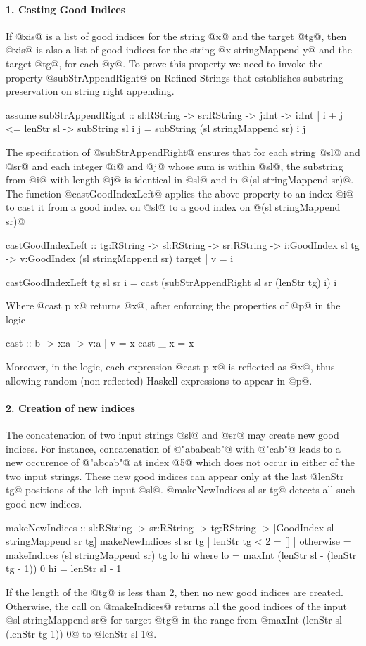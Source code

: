 \paragraph{1. Casting Good Indices}
If @xis@ is a list of good indices for the string @x@ and the target
@tg@, then @xis@ is also a list of good indices for the string
@x stringMappend y@ and the target @tg@, for each @y@.
%
To prove this property we need to invoke the property
@subStrAppendRight@ on Refined Strings that establishes
substring preservation on string right appending.
%
\begin{code}
assume subStrAppendRight
    :: sl:RString -> sr:RString -> j:Int
    ->  i:{Int | i + j <= lenStr sl }
    ->  { subString sl i j = subString (sl stringMappend sr) i j }
\end{code}
%
The specification of @subStrAppendRight@ ensures that for each
string @sl@ and @sr@ and each integer @i@ and @j@ whose sum is within @sl@,
the substring from @i@ with length @j@ is identical in @sl@ and in @(sl stringMappend sr)@.
%
The function @castGoodIndexLeft@ applies the above property to an index @i@
to cast it from a good index on @sl@ to a good index on @(sl stringMappend sr)@
%
\begin{code}
castGoodIndexLeft
  :: tg:RString -> sl:RString -> sr:RString
  -> i:GoodIndex sl tg
  -> {v:GoodIndex (sl stringMappend sr) target | v = i}

castGoodIndexLeft tg sl sr i
  = cast (subStrAppendRight sl sr (lenStr tg) i) i
\end{code}
%
Where @cast p x@ returns @x@, after enforcing the properties of @p@ in the logic
\begin{code}
cast :: b -> x:a -> {v:a | v = x }
cast _ x = x
\end{code}
%
Moreover, in the logic, each expression @cast p x@
is reflected as @x@,
thus allowing random (\ie non-reflected) Haskell expressions to appear in @p@.

\paragraph{2. Creation of new indices}
The concatenation of two input strings @sl@ and @sr@
may create new good indices.
%
For instance, concatenation of
@"ababcab"@ with @"cab"@
leads to a new occurence of @"abcab"@ at index @5@ which
does not occur in either of the two input strings.
%
These new good indices can appear only at the last @lenStr tg@ positions
of the left input @sl@.
%
@makeNewIndices sl sr tg@ detects all such good new indices.
%
\begin{code}
makeNewIndices
  :: sl:RString -> sr:RString -> tg:RString
  -> [GoodIndex {sl stringMappend sr} tg]
makeNewIndices sl sr tg
  | lenStr tg < 2 = []
  | otherwise     = makeIndices (sl stringMappend sr) tg lo hi
  where
    lo = maxInt (lenStr sl - (lenStr tg - 1)) 0
    hi = lenStr sl - 1
\end{code}
If the length of the @tg@ is less than 2, then no new good indices are created.
%
Otherwise,
the call on @makeIndices@ returns all the good indices of the input
@sl stringMappend sr@ for target @tg@
in the range from @maxInt (lenStr sl-(lenStr tg-1)) 0@ to  @lenStr sl-1@.
%

